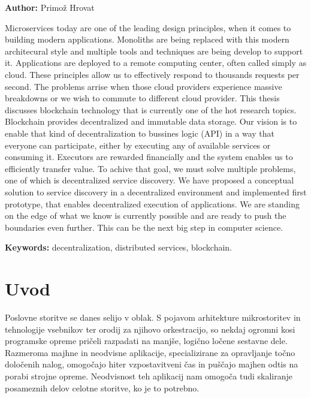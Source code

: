 \documentclass[a4paper, 12pt]{book}
\newcommand{\tauthor}{Primož Hrovat}
\newcommand{\tkeywordsEn}{decentralization, distributed services, blockchain}
\newcommand{\clearemptydoublepage}{\newpage{\pagestyle{empty}\cleardoublepage}}
\begin{document}
\noindent\textbf{Author:} \tauthor
\bigskip

\noindent 

Microservices today are one of the leading design principles, when it comes to building modern applications.
Monoliths are being replaced with this modern architecural style and multiple tools and techniques are being develop to support it.
Applications are deployed to a remote computing center, often called simply as cloud.
These principles allow us to effectively respond to thousands requests per second.
The problems arrise when those cloud providers experience massive breakdowns or we wish to commute to different cloud provider.
This thesis discusses blockchain technology that is currently one of the hot research topics.
Blockchain provides decentralized and immutable data storage.
Our vision is to enable that kind of decentralization to bussines logic (API) in a way that everyone can participate, either by executing any of available services or consuming it.
Executors are rewarded financially and the system enables us to efficiently transfer value.
To achive that goal, we must solve multiple problems, one of which is decentralized service discovery.
We have proposed a conceptual solution to service discovery in a decentralized environment and implemented first prototype, that enables decentralized execution of applications.
We are standing on the edge of what we know is currently possible and are ready to push the boundaries even further. This can be the next big step in computer science.

\bigskip

\noindent\textbf{Keywords:} \tkeywordsEn.
\clearemptydoublepage

\mainmatter
\setcounter{page}{1}
\pagestyle{fancy}

\chapter{Uvod}
Poslovne storitve se danes selijo v oblak.
S pojavom arhitekture mikrostoritev in tehnologije vsebnikov ter orodij za njihovo orkestracijo, so nekdaj ogromni kosi programske opreme pričeli razpadati na manjše, logično ločene sestavne dele.
Razmeroma majhne in neodvisne aplikacije, specializirane za opravljanje točno določenih nalog, omogočajo hiter vzpostavitveni čas in puščajo majhen odtis na porabi strojne opreme.
Neodvisnost teh aplikacij nam omogoča tudi skaliranje posameznih delov celotne storitve, ko je to potrebno.
\end{document}
